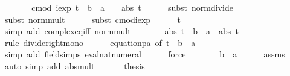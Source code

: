\documentclass{article}
\theoremstyle{definition}
\begin{document}
\begin{isabellebody}
\ \ \isamarkupfalse%
\ \isamarkupfalse%
\ {\isachardoublequoteopen}{\isasymdots}\ {\isacharequal}\ cmod\ {\isacharparenleft}iexp\ {\isacharparenleft}t\ {\isacharasterisk}\ {\isacharparenleft}b\ {\isacharminus}\ a{\isacharparenright}{\isacharparenright}\ {\isacharminus}\ {}{\isacharparenright}\ {\isacharslash}\ abs\ t{\isachardoublequoteclose}\isanewline
\ \ \ \ \isamarkupfalse%
\ {\isacharparenleft}subst\ norm{\isacharunderscore}divide{\isacharparenright}\isanewline
\ \ \ \ \isamarkupfalse%
\ {\isacharparenleft}subst\ norm{\isacharunderscore}mult{\isacharparenright}\isanewline
\ \ \ \ \isamarkupfalse%
\ {\isacharparenleft}subst\ cmod{\isacharunderscore}iexp{\isacharparenright}\isanewline
\ \ \ \ \isamarkupfalse%
\ {\isacharbackquoteopen}t\ {\isasymnoteq}\ {}{\isacharbackquoteclose}\ \isamarkupfalse%
\ {\isacharparenleft}simp\ add{\isacharcolon}\ complex{\isacharunderscore}eq{\isacharunderscore}iff\ norm{\isacharunderscore}mult{\isacharparenright}\isanewline
\ \ \isamarkupfalse%
\ \isamarkupfalse%
\ {\isachardoublequoteopen}{\isasymdots}\ {\isasymle}\ abs\ {\isacharparenleft}t\ {\isacharasterisk}\ {\isacharparenleft}b\ {\isacharminus}\ a{\isacharparenright}{\isacharparenright}\ {\isacharslash}\ abs\ t{\isachardoublequoteclose}\isanewline
\ \ \ \ \isamarkupfalse%
\ {\isacharparenleft}rule\ divide{\isacharunderscore}right{\isacharunderscore}mono{\isacharparenright}\isanewline
\ \ \ \ \isamarkupfalse%
\ equation{\isacharunderscore}{}{}p{}a\ {\isacharbrackleft}of\ {\isachardoublequoteopen}t\ {\isacharasterisk}\ {\isacharparenleft}b\ {\isacharminus}\ a{\isacharparenright}{\isachardoublequoteclose}\ {}{\isacharbrackright}\ \isamarkupfalse%
\ {\isacharparenleft}simp\ add{\isacharcolon}\ field{\isacharunderscore}simps\ eval{\isacharunderscore}nat{\isacharunderscore}numeral{\isacharparenright}\isanewline
\ \ \ \ \isamarkupfalse%
\ force\isanewline
\ \ \isamarkupfalse%
\ \isamarkupfalse%
\ {\isachardoublequoteopen}{\isasymdots}\ {\isacharequal}\ b\ {\isacharminus}\ a{\isachardoublequoteclose}\isanewline
\ \ \ \ \isamarkupfalse%
\ assms\ \isamarkupfalse%
\ {\isacharparenleft}auto\ simp\ add{\isacharcolon}\ abs{\isacharunderscore}mult{\isacharparenright}\ \isanewline
\ \ \isamarkupfalse%
\ \isamarkupfalse%
\ {\isacharquery}thesis\ \isacommand{{\isachardot}}\isamarkupfalse%
\isanewline
{}
\end{isabellebody}
\end{document}
